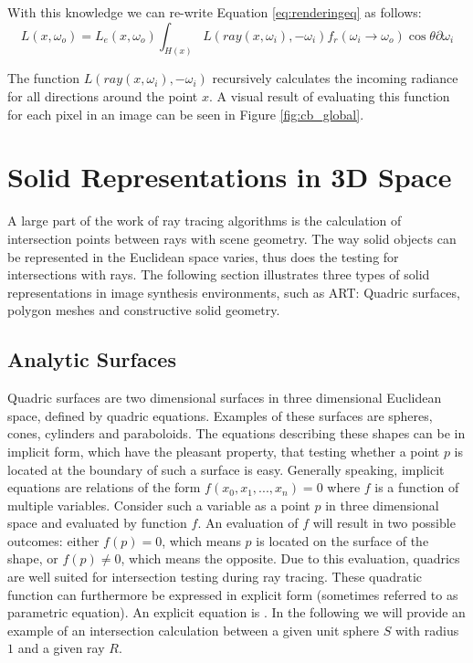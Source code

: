 With this knowledge we can re-write Equation \ref{eq:renderingeq} as follows:
\begin{equation}\label{eq:renderingeq_update}
L(x, \omega_{o}) = L_{e}(x, \omega_{o}) \int_{H(x)} L(ray(x, \omega_{i}), -\omega_{i})f_{r}(\omega_{i} \rightarrow \omega_{o})\cos\theta\partial\omega_{i}
\end{equation}

The function $L(ray(x, \omega_{i}), -\omega_{i})$ recursively calculates the incoming radiance for all directions around the point $x$. A visual result of evaluating this function for each pixel in an image can be seen in Figure \ref{fig:cb_global}.


\section{Solid Representations in 3D Space}

A large part of the work of ray tracing algorithms is the calculation of intersection points between rays with scene geometry.
The way solid objects can be represented in the Euclidean space varies, thus does the testing for intersections with rays. The following section illustrates three types of solid representations in image synthesis environments, such as ART: Quadric surfaces, polygon meshes and constructive solid geometry.

\subsection{Analytic Surfaces}
\label{sec:quadrics}
Quadric surfaces are two dimensional surfaces in three dimensional Euclidean space, defined by quadric equations. Examples of these surfaces are spheres, cones, cylinders and paraboloids. The equations describing these shapes can be in implicit form, which have the pleasant property, that testing whether a point $p$ is located at the boundary of such a surface is easy. Generally speaking, implicit equations are relations of the form  $f(x_{0}, x_{1}, ..., x_{n}) = 0$ where $f$ is a function of multiple variables. Consider such a variable as a point $p$ in three dimensional space and evaluated by function $f$. An evaluation of $f$ will result in two possible outcomes: either $f(p) = 0$, which means $p$ is located on the surface of the shape, or  $f(p) \ne 0$, which means the opposite.
Due to this evaluation, quadrics are well suited for intersection testing during ray tracing. These quadratic function can furthermore be expressed in explicit form (sometimes referred to as parametric equation). An explicit equation is .
In the following we will provide an example of an intersection calculation between a given unit sphere $S$ with radius $1$ and a given ray $R$. 

